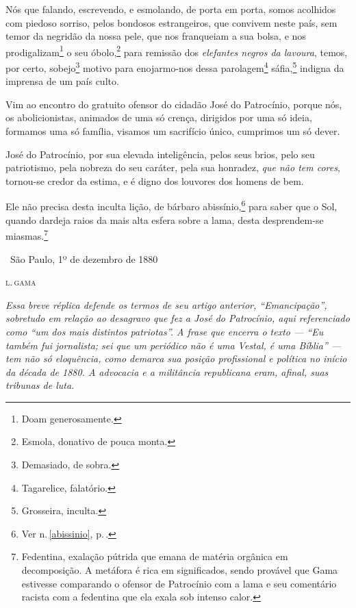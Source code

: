 Nós que falando, escrevendo, e esmolando, de porta em porta, somos
acolhidos com piedoso sorriso, pelos bondosos estrangeiros, que convivem
neste país, sem temor da negridão da nossa pele, que nos franqueiam a
sua bolsa, e nos prodigalizam\footnote{Doam generosamente.} o seu
óbolo,\footnote{Esmola, donativo de pouca monta.} para remissão dos
\emph{elefantes negros da lavoura}, temos, por certo, sobejo\footnote{
  Demasiado, de sobra.} motivo para enojarmo-nos dessa
parolagem\footnote{Tagarelice, falatório.} sáfia,\footnote{
  Grosseira, inculta.} indigna da imprensa de um país culto.

Vim ao encontro do gratuito ofensor do cidadão José do Patrocínio,
porque nós, os abolicionistas, animados de uma só crença, dirigidos por
uma só ideia, formamos uma só família, visamos um sacrifício único,
cumprimos um só dever.

José do Patrocínio, por sua elevada inteligência, pelos seus brios, pelo
seu patriotismo, pela nobreza do seu caráter, pela sua honradez,
\emph{que não tem cores}, tornou-se credor da estima, e é digno dos
louvores dos homens de bem.

Ele não precisa desta inculta lição, de bárbaro abissínio,\footnote{Ver n.\,\ref{abissinio}, p.\,\pageref{abissinio}.} para saber que o Sol, quando dardeja
raios da mais alta esfera sobre a lama, desta desprendem-se
miasmas.\footnote{Fedentina, exalação pútrida que emana de matéria
  orgânica em decomposição. A metáfora é rica em significados, sendo
  provável que Gama estivesse comparando o ofensor de Patrocínio com a
  lama e seu comentário racista com a fedentina que ela exala sob
  intenso calor.}

\medskip

\hfill\ São Paulo, 1º de dezembro de 1880

\hfill\textsc{l.\,gama}


\begin{resumo}
\emph{Essa breve réplica defende os termos de seu artigo anterior, ``Emancipação'',
sobretudo em relação ao desagravo que fez a José
do Patrocínio, aqui referenciado como ``um dos mais distintos patriotas''.
A frase que encerra o texto --- ``Eu também fui jornalista; sei que um
periódico não é uma Vestal, é uma Bíblia'' --- tem não só eloquência,
como demarca sua posição profissional e política no início da década de
1880. A advocacia e a militância republicana eram, afinal, suas tribunas
de luta.}
\end{resumo}

